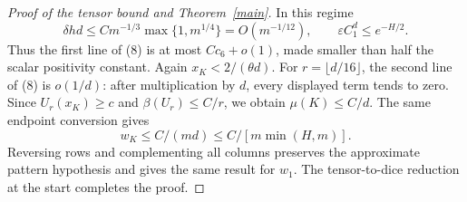 \documentclass[11pt]{article}
\begin{document}
\begin{proof}[Proof of the tensor bound and Theorem~\ref{main}]
In this regime
\[
 \delta hd\le C m^{-1/3}\max\{1,m^{1/4}\}=O(m^{-1/12}),
 \qquad \varepsilon C_1^d\le e^{-H/2}.
\]
Thus the first line of (8) is at most $Cc_6+o(1)$, made smaller
than half the scalar positivity constant. Again $x_K<2/(\theta d)$.
For $r=\lfloor d/16\rfloor$, the second line of (8) is $o(1/d)$:
after multiplication by $d$, every displayed term tends to zero.
Since $U_r(x_K)\ge c$ and $\beta(U_r)\le C/r$, we obtain
$\mu(K)\le C/d$. The same endpoint conversion gives
\[
 w_K\le C/(md)\le C/[m\min(H,m)].
\]
Reversing rows and complementing all columns preserves the approximate
pattern hypothesis and gives the same result for $w_1$.
The tensor-to-dice reduction at the start completes the proof.
\end{proof}
\end{document}
